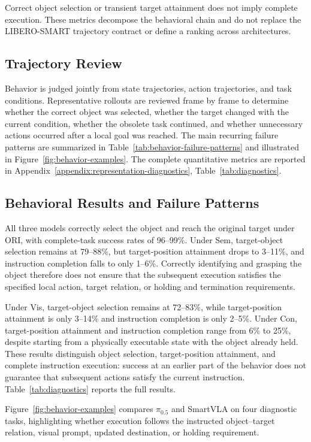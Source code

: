 Correct object selection or transient target attainment does not imply
complete execution. These metrics decompose the behavioral chain and do
not replace the LIBERO-SMART trajectory contract or define a ranking
across architectures.

\subsection{Trajectory Review}

Behavior is judged jointly from state trajectories, action trajectories,
and task conditions. Representative rollouts are reviewed frame by frame
to determine whether the correct object was selected, whether the target
changed with the current condition, whether the obsolete task continued,
and whether unnecessary actions occurred after a local goal was reached.
The main recurring failure patterns are summarized in
Table~\ref{tab:behavior-failure-patterns} and illustrated in
Figure~\ref{fig:behavior-examples}. The complete quantitative
metrics are reported in Appendix~\ref{appendix:representation-diagnostics},
Table~\ref{tab:diagnostics}.

\subsection{Behavioral Results and Failure Patterns}
\label{behavioral-diagnosis}

All three models correctly select the object and reach the original target under ORI, with
complete-task success rates of 96--99\%. Under Sem, target-object selection remains at 79--88\%, but
target-position attainment drops to 3--11\%, and instruction completion falls to only 1--6\%.
Correctly identifying and grasping the object therefore does not ensure that the subsequent
execution satisfies the specified local action, target relation, or holding and termination
requirements.

Under Vis, target-object selection remains at 72--83\%, while target-position attainment is only
3--14\% and instruction completion is only 2--5\%. Under Con, target-position attainment and
instruction completion range from 6\% to 25\%, despite starting from a physically executable state
with the object already held. These results distinguish object selection, target-position
attainment, and complete instruction execution: success at an earlier part of the behavior does not
guarantee that subsequent actions satisfy the current instruction. Table~\ref{tab:diagnostics}
reports the full results.

%

Figure~\ref{fig:behavior-examples} compares $\pi_{0.5}$ and SmartVLA on four
diagnostic tasks, highlighting whether execution follows the instructed
object--target relation, visual prompt, updated destination, or holding
requirement.

%

